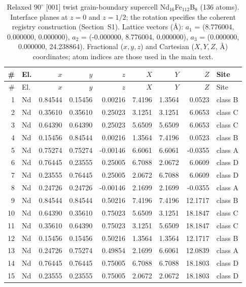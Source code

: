 \begin{longtable}{rlrrrrrrl}
\caption{Relaxed $90^\circ$ [001] twist grain-boundary supercell Nd$_{16}$Fe$_{112}$B$_8$ (136 atoms). Interface planes at $z = 0$ and $z = 1/2$; the rotation specifies the coherent registry construction (Section~S1). Lattice vectors (\AA): $a_1$ = (8.776004, 0.000000, 0.000000), $a_2$ = (-0.000000, 8.776004, 0.000000), $a_3$ = (0.000000, 0.000000, 24.238864). Fractional ($x,y,z$) and Cartesian ($X,Y,Z$, \AA) coordinates; atom indices are those used in the main text.}\label{tab:S2}\\
\toprule
\# & El. & $x$ & $y$ & $z$ & $X$ & $Y$ & $Z$ & Site \\
\midrule
\endfirsthead
\toprule
\# & El. & $x$ & $y$ & $z$ & $X$ & $Y$ & $Z$ & Site \\
\midrule
\endhead
1 & Nd & 0.84544 & 0.15456 & 0.00216 & 7.4196 & 1.3564 & 0.0523 & class B \\
2 & Nd & 0.35610 & 0.35610 & 0.25023 & 3.1251 & 3.1251 & 6.0653 & class C \\
3 & Nd & 0.64390 & 0.64390 & 0.25023 & 5.6509 & 5.6509 & 6.0653 & class C \\
4 & Nd & 0.15456 & 0.84544 & 0.00216 & 1.3564 & 7.4196 & 0.0523 & class B \\
5 & Nd & 0.75274 & 0.75274 & -0.00146 & 6.6061 & 6.6061 & -0.0355 & class A \\
6 & Nd & 0.76445 & 0.23555 & 0.25005 & 6.7088 & 2.0672 & 6.0609 & class D \\
7 & Nd & 0.23555 & 0.76445 & 0.25005 & 2.0672 & 6.7088 & 6.0609 & class D \\
8 & Nd & 0.24726 & 0.24726 & -0.00146 & 2.1699 & 2.1699 & -0.0355 & class A \\
9 & Nd & 0.84544 & 0.84544 & 0.50216 & 7.4196 & 7.4196 & 12.1717 & class B \\
10 & Nd & 0.64390 & 0.35610 & 0.75023 & 5.6509 & 3.1251 & 18.1847 & class C \\
11 & Nd & 0.35610 & 0.64390 & 0.75023 & 3.1251 & 5.6509 & 18.1847 & class C \\
12 & Nd & 0.15456 & 0.15456 & 0.50216 & 1.3564 & 1.3564 & 12.1717 & class B \\
13 & Nd & 0.24726 & 0.75274 & 0.49854 & 2.1699 & 6.6061 & 12.0839 & class A \\
14 & Nd & 0.76445 & 0.76445 & 0.75005 & 6.7088 & 6.7088 & 18.1803 & class D \\
15 & Nd & 0.23555 & 0.23555 & 0.75005 & 2.0672 & 2.0672 & 18.1803 & class D \\

\end{longtable}

